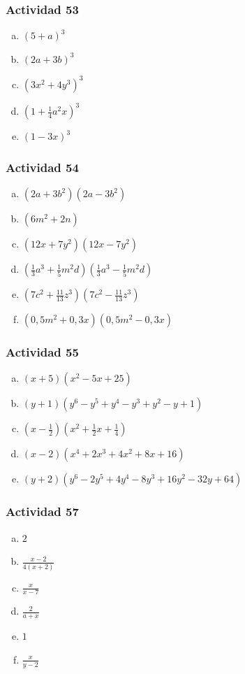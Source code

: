 \documentclass[a4paper, twocolumn]{article}
\begin{document}
\subsubsection*{Actividad 53}
\begin{enumerate}[a)]
\item $(5+a)^3$
\item $(2a+3b)^3$
\item $(3x^2+4y^3)^3$
\item $(1+\frac{1}{4}a^2x)^3$
\item $(1-3x)^3$


\end{enumerate}

\subsubsection*{Actividad 54}
\begin{enumerate}[a)]
\item $(2a+3b^2)(2a-3b^2)$
\item $(6m^2+2n)$
\item $(12x+7y^2)(12x-7y^2)$
\item $(\frac{1}{3} a^3 + \frac{1}{5} m^2 d)(\frac{1}{3} a^3 - \frac{1}{5} m^2 d)$
\item $(7c^2+\frac{11}{13}z^3)(7c^2-\frac{11}{13}z^3)$
\item $(0,5m^2+0,3x)(0,5m^2-0,3x)$
\end{enumerate}

\subsubsection*{Actividad 55}
\begin{enumerate}[a)]
\item $(x+5)(x^2 -5x + 25)$
\item $(y+1)(y^6-y^5+y^4-y^3+y^2-y+1)$
\item $(x-\frac{1}{2})(x^2 + \frac{1}{2} x + \frac{1}{4})$
\item $(x-2)(x^4+2x^3+4x^2+8x+16)$
\item $(y+2)(y^6 - 2y^5 + 4y^4 - 8y^3 + 16y^2 - 32y + 64)$
\end{enumerate}

\subsubsection*{Actividad 57}
\begin{enumerate}[a)]
\item $2$
\item $\frac{x-2}{4(x+2)}$
\item $\frac{x}{x-7}$
\item $\frac{2}{a+x}$
\item $1$
\item $\frac{x}{y-2}$
\end{enumerate}
\end{document}
